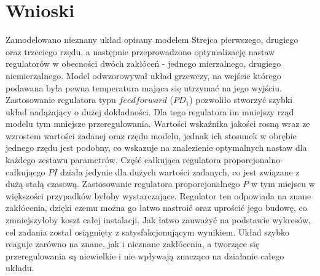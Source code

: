 \chapter{Wnioski}

 Zamodelowano nieznany układ opisany modelem Strejca pierwszego, drugiego oraz trzeciego rzędu, a następnie przeprowadzono optymalizację nastaw regulatorów w obecności dwóch zakłóceń - jednego mierzalnego, drugiego niemierzalnego. Model odwzorowywał układ grzewczy, na wejście którego podawana była pewna temperatura mająca się utrzymać na jego wyjściu. Zastosowanie regulatora typu $feedforward$ ($PD_1$) pozwoliło stworzyć szybki układ nadążający o dużej dokładności. Dla tego regulatora im mniejszy rząd modelu tym mniejsze przeregulowania. Wartości wskaźnika jakości rosną wraz ze wzrostem wartości zadanej oraz rzędu modelu, jednak ich stosunek w obrębie jednego rzędu jest podobny, co wskazuje na znalezienie optymalnych nastaw dla każdego zestawu parametrów. Część całkująca regulatora proporcjonalno-całkującgo $PI$ działa jedynie dla dużych wartości zadanych, co jest związane z dużą stałą czasową. Zastosowanie regulatora proporcjonalnego $P$ w tym miejscu w większości przypadków byłoby wystarczające. Regulator ten odpowiada na znane zakłócenia, dzięki czemu można go łatwo nastroić oraz uprościć jego budowę, co zmniejszyłoby koszt całej instalacji. Jak łatwo zauważyć na podstawie wykresów, cel zadania został osiągnięty z satysfakcjonującym wynikiem. Układ szybko reaguje zarówno na znane, jak i nieznane zakłócenia, a tworzące się przeregulowania są niewielkie i nie wpływają znacząco na działanie całego układu.